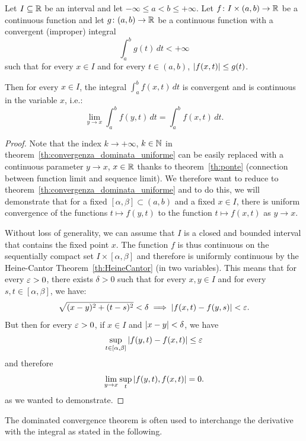 \begin{theorem}
  \label{th:convergenza_dominata}%
  \mymark{**}%
Let $I\subseteq {\mathbb R}$ be an interval and let 
$-\infty \le a < b \le +\infty$.
Let $f\colon I \times(a,b)\to {\mathbb R}$ be a continuous function 
and let $g\colon(a,b)\to {\mathbb R}$ be a continuous function with a 
convergent (improper) integral
\[
 \int_a^b g(t)\, dt < +\infty
\]
such that for every $x\in I$ and for every $t\in(a,b)$, ${\left|f(x,t)\right|} \le g(t)$.

Then for every $x\in I$, the integral $\int_a^b f(x,t)\, dt$ is convergent and
is continuous
in the variable $x$, i.e.:
\[
  \lim_{y\to x} \int_a^b f(y,t)  \, dt 
  = \int_a^b f(x,t)\, dt.
\]
\end{theorem}
%
\begin{proof}
Note that the index $k\to +\infty$, $k\in {\mathbb N}$ 
in theorem~\ref{th:convergenza_dominata_uniforme} 
can be easily replaced with 
a continuous parameter $y\to x$, $x\in {\mathbb R}$
thanks to theorem~\ref{th:ponte} (connection between function limit 
and sequence limit).
We therefore want to reduce to theorem~\ref{th:convergenza_dominata_uniforme} 
and to do this, we will demonstrate that for a fixed $[\alpha,\beta]\subset
(a,b)$
and a fixed $x\in I$, there is uniform convergence 
of the functions $t\mapsto f(y,t)$ to the function $t\mapsto f(x,t)$
as $y\to x$. 

Without loss of generality, we can assume that $I$ is a closed and bounded
interval
that contains the fixed point $x$. 
The function $f$ is thus continuous on the sequentially compact set $I\times
[\alpha,\beta]$
and therefore is uniformly continuous
by the Heine-Cantor Theorem~\ref{th:HeineCantor} (in two variables).
This means that for every $\varepsilon>0$, there exists $\delta>0$ such that for every
$x,y\in I$
and for every $s,t\in[\alpha,\beta]$, we have:
\[
\sqrt{(x-y)^2+(t-s)^2} < \delta \implies {\left|f(x,t)-f(y,s)\right|} < \varepsilon.  
\]
But then for every $\varepsilon>0$, if $x\in I$ and ${\left|x-y\right|} < \delta$, we have 
\[
  \sup_{t\in\left[\alpha,\beta\right]} {\left|f(y,t)-f(x,t)\right|} \le \varepsilon
\]
and therefore
\[
  \lim_{y\to x}  \sup_t {\left|f(y,t), f(x,t)\right|} = 0.
\]
as we wanted to demonstrate.
\end{proof}
%
The dominated convergence theorem is often used 
to interchange the derivative with the integral as stated in the following.
%
